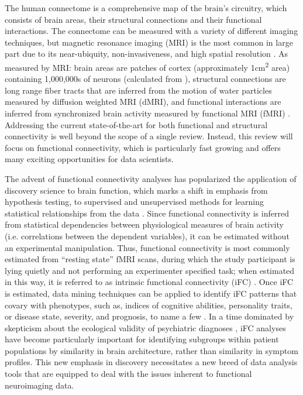 \documentclass{bmcart}
\begin{document}
The human connectome is a comprehensive map of the brain's circuitry, which consists of brain areas, their structural connections and their functional interactions. The connectome can be measured with a variety of different imaging techniques, but magnetic resonance imaging (MRI) is the most common in large part due to its near-ubiquity, non-invasiveness, and high spatial resolution \cite{Craddock2013}. As measured by MRI: brain areas are patches of cortex (approximately 1\si{\centi\meter\squared} area) \cite{Varela2001} containing 1,000,000s of neurons (calculated from \cite{Aguirre2014}), structural connections are long range fiber tracts that are inferred from the motion of water particles measured by diffusion weighted MRI (dMRI), and functional interactions are inferred from synchronized brain activity measured by functional MRI (fMRI) \cite{Behrens2012}. Addressing the current state-of-the-art for both functional and structural connectivity is well beyond the scope of a single review. Instead, this review will focus on functional connectivity, which is particularly fast growing and offers many exciting opportunities for data scientists.

The advent of functional connectivity analyses has popularized the application of discovery science to brain function, which marks a shift in emphasis from hypothesis testing, to supervised and unsupervised methods for learning statistical relationships from the data \cite{Biswal2010}. Since functional connectivity is inferred from statistical dependencies between physiological measures of brain activity (i.e. correlations between the dependent variables), it can be estimated without an experimental manipulation. Thus, functional connectivity is most commonly estimated from ``resting state'' fMRI scans, during which the study participant is lying quietly and not performing an experimenter specified task; when estimated in this way, it is referred to as intrinsic functional connectivity (iFC) \cite{Biswal1995}. Once iFC is estimated, data mining techniques can be applied to identify iFC patterns that covary with phenotypes, such as, indices of cognitive abilities, personality traits, or disease state, severity, and prognosis, to name a few \cite{Varoquaux2013}. In a time dominated by skepticism about the ecological validity of psychiatric diagnoses \cite{Kapur2012}, iFC analyses have become particularly important for identifying subgroups within patient populations by similarity in brain architecture, rather than similarity in symptom profiles. This new emphasis in discovery necessitates a new breed of data analysis tools that are equipped to deal with the issues inherent to functional neuroimaging data.
\end{document}
